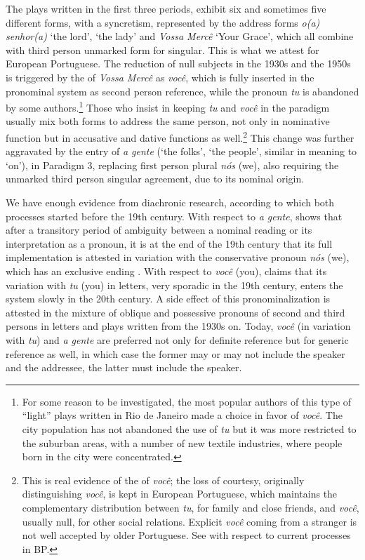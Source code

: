 \documentclass[output=paper]{langsci/langscibook}
\begin{document}
The plays written in the first three periods, exhibit six  and sometimes
five different forms, with a syncretism, represented by the address forms
\emph{o(a) senhor(a)} \enquote*{the lord}, \enquote*{the lady} and \emph{Vossa
Mercê} \enquote*{Your Grace}, which all combine with third person unmarked form
for singular.  This is what we attest for European Portuguese. The reduction of
null subjects in the 1930s and the 1950s is triggered by the
of \emph{Vossa Mercê} as \emph{você}, which is fully inserted in the pronominal
system as second person reference, while the pronoun \emph{tu} is abandoned by
some authors.\footnote{For some reason to be investigated, the most popular
    authors of this type of “light” plays written in Rio de Janeiro made a
    choice in favor of \emph{você}. The city population has not abandoned the
use of \emph{tu} but it was more restricted to the suburban areas, with a
number of new textile industries, where people born in the city were
concentrated.} Those who insist in keeping \emph{tu} and \emph{você} in the
paradigm usually mix both forms to address the same person, not only in
nominative function but in accusative and dative functions as well.\footnote{This is real evidence of the
     of \emph{você}; the loss of courtesy, originally
    distinguishing \emph{você}, is kept in European Portuguese, which maintains
    the complementary distribution between \emph{tu}, for family and close
    friends, and \emph{você}, usually null, for other social relations.
    Explicit \emph{você} coming from a stranger is not well accepted by older
    Portuguese. See \citet{LopesBrocardo2016} with respect to current
 processes in \gls{BP}.} This
change was further aggravated by the entry of \emph{a gente} (\enquote*{the
folks}, \enquote*{the people}, similar in meaning to 
\enquote*{on}), in Paradigm 3, replacing first person plural \emph{nós} (we),
also requiring the unmarked third person singular agreement, due to its nominal
origin.

We have enough evidence from diachronic research, according to which both
processes started before the 19th century. With respect to \emph{a gente},
\citet{Lopes2003} shows that after a transitory period of ambiguity between a
nominal reading or its interpretation as a pronoun, it is at the end of the
19th century that its full implementation is attested in variation with the
conservative pronoun \emph{nós} (we), which has an exclusive ending
.  With respect to \emph{você} (you), \citet{Lopes2003}
claims that its variation with \emph{tu} (you) in letters, very sporadic in the
19th century, enters the system slowly in the 20th century. A side  effect of
this pronominalization is attested in the mixture of oblique and possessive
pronouns of second and third persons in letters and plays written from the
1930s on. Today, \emph{você} (in variation with \emph{tu}) and \emph{a gente}
are preferred not only for definite reference but for generic reference as
well, in which case the former may or may not include the speaker and the
addressee, the latter must include the speaker.
\end{document}
